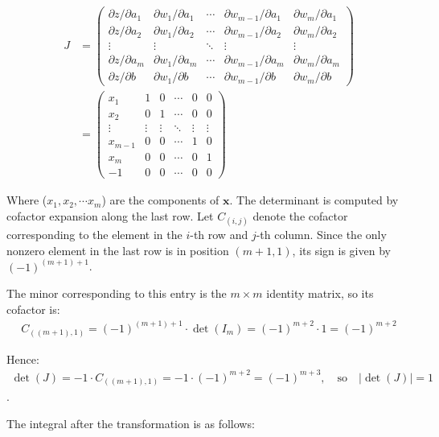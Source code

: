 \documentclass[a4paper,12pt]{article}
\newcommand{\vx}{\bm{x}}
\newcommand{\pd}{\partial}
\newcommand{\pdiffl}[2]{\pd #1/\pd #2}
\begin{document}
\begin{align*}
  J &=
  \begin{pmatrix}
    \pdiffl{z}{a_1} & \pdiffl{w_1}{a_1} & \cdots & \pdiffl{w_{m-1}}{a_1} & \pdiffl{w_m}{a_1} \\
    \pdiffl{z}{a_2} & \pdiffl{w_1}{a_2} & \cdots & \pdiffl{w_{m-1}}{a_2} & \pdiffl{w_m}{a_2} \\
    \vdots         & \vdots           & \ddots & \vdots               & \vdots           \\
    \pdiffl{z}{a_m} & \pdiffl{w_1}{a_m} & \cdots & \pdiffl{w_{m-1}}{a_m} & \pdiffl{w_m}{a_m} \\
    \pdiffl{z}{b}   & \pdiffl{w_1}{b}   & \cdots & \pdiffl{w_{m-1}}{b}   & \pdiffl{w_m}{b}
  \end{pmatrix}
  \\[1.5ex]
  &=
  \begin{pmatrix}
    x_1 & 1 & 0 & \cdots & 0 & 0 \\
    x_2 & 0 & 1 & \cdots & 0 & 0 \\
    \vdots & \vdots & \vdots & \ddots & \vdots & \vdots \\
    x_{m-1} & 0 & 0 & \cdots & 1 & 0 \\
    x_m & 0 & 0 & \cdots & 0 & 1 \\
    -1 & 0 & 0 & \cdots & 0 & 0
  \end{pmatrix}
\end{align*}

Where ($x_1, x_2, \cdots x_m$) are the components of $\vx$. 
The determinant is computed by cofactor expansion along the last row. Let $C_{(i,j)}$ denote the cofactor corresponding to the element in the $i$-th row and $j$-th column. Since the only nonzero element in the last row is in position $(m+1, 1)$, its sign is given by $(-1)^{(m+1)+1}$.

The minor corresponding to this entry is the $m \times m$ identity matrix, so its cofactor is:
\begin{align*}
C_{((m+1),1)} = (-1)^{(m+1)+1} \cdot \det(I_m) = (-1)^{m+2} \cdot 1 = (-1)^{m+2}
\end{align*}

Hence:
\begin{align*}
\det(J) =-1 \cdot C_{((m+1), 1)}= -1 \cdot (-1)^{m+2} = (-1)^{m+3}, \quad \text{so} \quad |\det(J)| = 1
\end{align*}.

The integral after the transformation is as follows:
\end{document}
